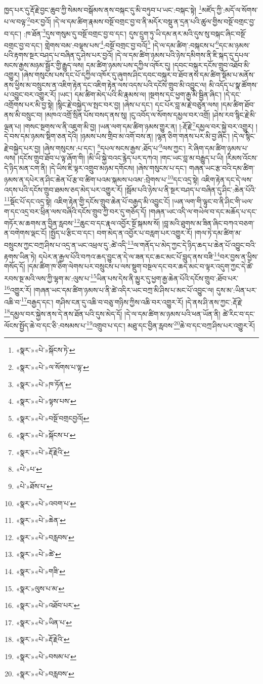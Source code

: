 ཁྱད་པར་དུ་རྡོ་རྗེ་བྱང་ཆུབ་ཀྱི་སེམས་བསྒོམས་ནས་བསྐང་དུ་མི་བཏུབ་པ་ཡང་:བསྐང་སྟེ། \footnote{«སྣར་»«པེ་»སྐོངས་ཏེ་}མཛོད་ཀྱི་:མདོ་ལ་སོགས་པ་ལ་བལྟ་\footnote{«སྣར་»«པེ་»ལ་སོགས་པ་ལྟ་}བར་བྱའོ། །དེ་ལ་དམ་ཚིག་རྣམས་བསྔོ་བགྲང་བྱ་བ་ནི་མདོར་བསྡུ་ན་དྲན་པའི་ཚུལ་གྱིས་བསྔོ་བགྲང་བྱ་བ་དང་། :ཁ་ཐོན་\footnote{«སྣར་»«པེ་»ཁ་ཏོན་}དུས་གསུམ་དུ་བསྔོ་བགྲང་བྱ་བ་དང་། དུས་དྲུག་ཏུ་ཡི་དམ་ནར་མའི་དུས་སུ་བསྐང་ཞིང་བསྔོ་བགྲང་བྱ་བ་དང་། གླེགས་བམ་:བལྟས་པས་\footnote{«སྣར་»«པེ་»ལྟས་པས་}:བསྔོ་བགྲང་བྱ་བའོ།\footnote{«སྣར་»«པེ་»བསྔོ་བགྲངབྱའོ།} །དེ་ལ་དམ་ཚིག་:བསྐངས་པ་\footnote{«སྣར་»«པེ་»སྐོངས་པ་}དང་མ་ཉམས་པའི་རྟགས་སྔར་བཤད་པ་བཞིན་དུ་ཤེས་པར་བྱའོ། །དེ་ལ་དམ་ཚིག་ཉམས་པའི་ཉེས་དམིགས་ནི་ཇི་སྐད་དུ་དཔལ་སངས་རྒྱས་མཉམ་སྦྱོར་གྱི་རྒྱུད་ལས། དམ་ཚིག་ཉམས་པས་དཀྱིལ་འཁོར་དུ། །དབང་བསྐུར་དངོས་གྲུབ་འཐོབ་མི་འགྱུར། །ཞེས་གསུངས་པས་དང་པོ་དཀྱིལ་འཁོར་དུ་ཞུགས་ཤིང་དབང་བསྐུར་བ་ཐོབ་ནས་དམ་ཚིག་སྡོམ་པ་མནོས་ནས་ཕྱིས་མ་བསྲུངས་ན་འཇིག་རྟེན་དང་འཇིག་རྟེན་ལས་འདས་པའི་དངོས་གྲུབ་མི་འབྱུང་ལ། མི་འདོད་པ་སྣ་ཚོགས་པ་འབྱུང་བར་འགྱུར་རོ། །ཡང་། དམ་ཚིག་མེད་པའི་མི་རྣམས་ལ། །སྔགས་དང་ཕྱག་རྒྱ་མི་སྦྱིན་ཞིང་། །དེ་དང་འགྲོགས་པར་མི་བྱ་སྟེ། །སྙིང་རྗེ་བསྐྱེད་ལ་སྤང་བར་བྱ། །ཞེས་པ་དང་། དང་པོར་བླ་མ་རྗེ་བཙུན་ལས། །དམ་ཚིག་ཐོབ་ནས་མི་བསྲུང་བ། །མཁའ་འགྲོ་སྲིན་པོས་བསད་ནས་སུ། །ངུ་འབོད་ལ་སོགས་དམྱལ་བར་འགྲོ། །ཤེས་རབ་སྙིང་རྗེ་མི་ལྡན་པ། །གསང་སྔགས་ལ་ནི་འཇུག་མི་བྱ། །ཡན་ལག་དམ་ཚིག་ཉམས་གྱུར་ན། །:རྡོ་རྗེ་\footnote{«སྣར་»«པེ་»རྡོ་རྗེའི་}དམྱལ་བར་སྐྱེ་བར་འགྱུར། །དེ་བས་དམ་ཉམས་སྡིག་ཅན་དེའི། །ཉམས་པས་གྲིབ་མ་འགོ་བས་ན། །ལྷན་ཅིག་གནས་པར་མི་བྱ་ཞིང་། །དེ་ལ་སྙིང་རྗེ་བསྐྱེད་པར་བྱ། །ཞེས་གསུངས་:པ་དང་། \footnote{«པེ་»པ་}དཔལ་སངས་རྒྱས་:ཐོད་པ་\footnote{«པེ་»ཐོས་པ་}ལས་ཀྱང་། རེ་ཞིག་དམ་ཚིག་ཉམས་པ་ལས། །དངོས་གྲུབ་ཐོབ་པ་ལྟ་ཞོག་གི། །མི་ཡི་སྐྱེ་བའང་རྙེད་པར་དཀའ། །གང་ཡང་བླ་མ་བརྒྱུད་པ་ཡི། །རིམས་འོངས་དེ་ཉིད་མན་ངག་ནི། །དེ་ཡིས་ཇི་ལྟར་འགྲུབ་མཉམ་དགོངས། །ཞེས་གསུངས་པ་དང་། གཞན་ཡང་རྩ་བའི་དམ་ཚིག་ཉམས་ན་དཔེར་ན་ཤིང་ཆེན་པོ་རྩ་བ་ཚིག་པའམ་སྐམས་པའམ་:བྲེགས་པ་\footnote{«སྣར་»«པེ་»འབག་པ་}དང་འདྲ་སྟེ། འཇིག་རྟེན་དང་དེ་ལས་འདས་པའི་དངོས་གྲུབ་ཐམས་ཅད་མེད་པར་འགྱུར་རོ། །སྦོམ་པའི་ཉེས་པ་ནི་སྔར་བཤད་པ་བཞིན་དུ་ཤིང་:ཆེན་པོའི་\footnote{«སྣར་»«པེ་»ཆེན་}སྡོང་པོ་དང་འདྲ་སྟེ། འཇིག་རྟེན་གྱི་དངོས་གྲུབ་ཆེན་པོ་བརྒྱད་མི་འབྱུང་ངོ། །ཡན་ལག་གི་ལྟུང་བ་ནི་ཤིང་གི་ཡལ་ག་དང་འདྲ་བར་ཕྲིན་ལས་བཞིའི་དངོས་གྲུབ་ཀྱི་བར་དུ་གཅོད་དོ། །གཞན་ཡང་འདི་ལ་གཡེལ་བ་དང་མཆོད་པ་དང་གཏོར་མ་ཆགས་ན་བྱིན་རླབས་\footnote{«སྣར་»«པེ་»བརླབས་}ཆུང་བ་དང་རྣལ་འབྱོར་སྔོ་སྐམས་སོ། །བླ་མའི་ཐུགས་མ་ཟིན་ཞིང་བཀའ་བཅག་ན་བགེགས་ལྡང་ངོ། །སྤྱོད་པ་རྩིང་བ་དང་། བག་མེད་ན་འབྱོར་པ་བརླག་པར་འགྱུར་རོ། །གལ་ཏེ་དམ་ཚིག་མ་བསྲུངས་ཀྱང་བཀྲ་ཤིས་པ་འདྲ་ན་ཡང་འཕྲལ་དུ་:ཚེ་འདི་\footnote{«སྣར་»«པེ་»ཚེ་}ལ་གནོད་པ་མེད་ཀྱང་དེ་ཉིད་ཆད་པ་ཆེན་པོ་འབྱུང་བའི་རྟགས་ཡིན་ཏེ། དཔེར་ན་རྒྱལ་པོའི་བཀའ་ཆད་བྱུང་ན་དེ་ལ་ཟན་དང་ཆང་མང་པོ་བླུད་ནས་བཟི་\footnote{«སྣར་»«པེ་»གཟི་}བར་བྱས་ན་ཕྱིས་གསོད་དོ། །དམ་ཚིག་ཁ་ཅིག་ལེགས་པར་བསྲུངས་པ་ལས་སྡུག་བསྔལ་དང་བར་ཆད་མང་བ་ལྟར་འདུག་ཀྱང་དེ་ཚེ་རབས་སྔ་མའི་ལས་ཀྱི་ལྷག་མ་:ལུས་པ་\footnote{«སྣར་»ལུས་པ་མ་}ཡིན་པས་དེས་ནི་མྱུར་དུ་ཕྱག་རྒྱ་ཆེན་པོའི་དངོས་གྲུབ་:ཐོབ་པར་\footnote{«སྣར་»«པེ་»འཐོབ་པར་}འགྱུར་རོ། །གཞན་ཡང་དམ་ཚིག་ཉམས་པ་ནི་ཚེ་འདིར་ཡང་བཀྲ་མི་ཤིས་པ་མང་པོ་འབྱུང་ལ། དུས་མ་:ཡིན་པར་འཆི་བ་\footnote{«སྣར་»«པེ་»ཡིན་པ་}བརྒྱད་དང་། གཤིས་ངན་དུ་འཆི་བ་བཅུ་གཉིས་ཀྱིས་འཆི་བར་འགྱུར་རོ། །དེ་ནས་ཤི་ནས་ཀྱང་:རྡོ་རྗེ་\footnote{«སྣར་»«པེ་»རྡོ་རྗེའི་}དམྱལ་བར་སྐྱེས་ནས་དེ་ནས་ཐོན་པའི་དུས་མེད་དོ། །དེ་ལ་དམ་ཚིག་མ་ཉམས་པའི་ཕན་ཡོན་ནི། ཚེ་རིང་བ་དང་ལོངས་སྤྱོད་ཆེ་བ་དང་ཅི་:བསམས་པ་\footnote{«སྣར་»«པེ་»བསམ་པ་}འགྲུབ་པ་དང་། མཐུ་དང་བྱིན་རླབས་\footnote{«སྣར་»«པེ་»བརླབས་}ཆེ་བ་དང་བཀྲ་ཤིས་པར་འགྱུར་རོ། 